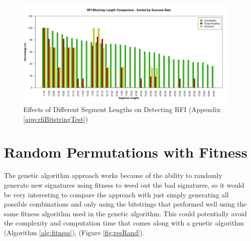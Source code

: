 \begin{figure}[H]
	\centering
	\includegraphics[width=450px]{./assets/appendix/fullresults/ga/bitlength/Results_SuccessRate_RFI.png}
	\caption{Effects of Different Segment Lengths on Detecting RFI (Appendix \ref{app:rfiBitstringTest})}
	\label{fig:resLengthRFI}
\end{figure}

\newpage
\section{Random Permutations with Fitness} \label{sec:resRand}

The genetic algorithm approach works because of the ability to randomly generate new signatures using fitness to weed out the bad signatures, so it would be very interesting to compare the approach with just simply generating all possible combinations and only using the bitstrings that performed well using the same fitness algorithm used in the genetic algorithm.  This could potentially avoid the complexity and computation time that comes along with a genetic algorithm (Algorithm \ref{alg:fitness}), (Figure \ref{fig:resRand}).

